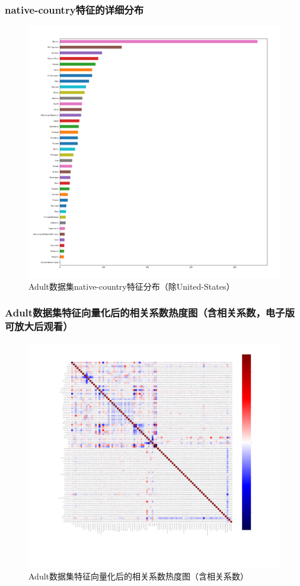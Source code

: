 \documentclass[12pt,a4paper]{article}
\theoremstyle{definition}
\begin{document}
{\begin{appendix}
	\subsubsection{native-country特征的详细分布}
	\label{apd:native-country}
	
	\vspace{-0.02\linewidth}
	\begin{figure}[H]
		\centering
		\includegraphics[width=0.75\linewidth]{img/native_country_dis2.pdf}
		\caption{Adult数据集native-country特征分布（除United-States）}
		\label{fig:class_feature_dis_detail}
	\end{figure}
	
	\subsubsection{Adult数据集特征向量化后的相关系数热度图（含相关系数，电子版可放大后观看）}
	\label{apd:heat}
	
	\begin{figure}[H]
		\centering
		\includegraphics[width=0.85\linewidth]{img/cof_heat2_anno.png}
		\caption{Adult数据集特征向量化后的相关系数热度图（含相关系数）}
		\label{fig:heat4}
	\end{figure}
	

\end{appendix}}
\end{document}
